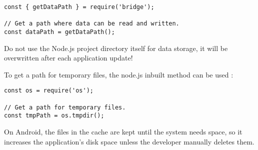 \begin{verbatim}
const { getDataPath } = require('bridge');

// Get a path where data can be read and written.
const dataPath = getDataPath();
\end{verbatim}

\begin{warning}[Warning]
  Do not use the Node.js project directory itself for data storage, it will be overwritten after each application update!
  \cite{nodejs-mobile:docs}
\end{warning}

To get a path for temporary files, the node.js inbuilt method  can be used \cite{nodejs}:

\begin{verbatim}
const os = require('os');

// Get a path for temporary files.
const tmpPath = os.tmpdir();
\end{verbatim}

\begin{warning}[Warning]
  On Android, the files in the cache are kept until the system needs space, so it increases the application's disk space unless the developer manually deletes them.
  \cite{nodejs-mobile:docs}
\end{warning}

\printfn
